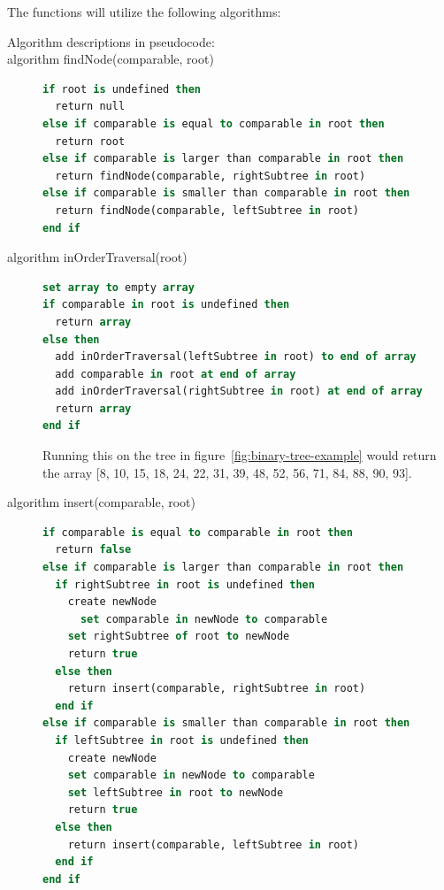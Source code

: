 \documentclass {article}
\begin{document}
The functions will utilize the following algorithms:
\begin{description}
\item[Algorithm descriptions in pseudocode:]
\item [algorithm findNode(comparable, root)]
\item[]
\begin{lstlisting}[language=Pascal]
if root is undefined then
  return null
else if comparable is equal to comparable in root then
  return root
else if comparable is larger than comparable in root then
  return findNode(comparable, rightSubtree in root)
else if comparable is smaller than comparable in root then
  return findNode(comparable, leftSubtree in root)
end if
\end{lstlisting}
 
\item [algorithm inOrderTraversal(root)]
\item []
\begin{lstlisting}[language=Pascal]
set array to empty array
if comparable in root is undefined then
  return array
else then
  add inOrderTraversal(leftSubtree in root) to end of array
  add comparable in root at end of array
  add inOrderTraversal(rightSubtree in root) at end of array
  return array
end if
\end{lstlisting}
 
\item[] Running this on the tree in figure~\ref{fig:binary-tree-example} would return the array [8, 10, 15, 18, 24, 22, 31, 39, 48, 52, 56, 71, 84, 88, 90, 93].
 
\item [algorithm insert(comparable, root)]
\item []
\begin{lstlisting}[language=Pascal]
if comparable is equal to comparable in root then
  return false
else if comparable is larger than comparable in root then
  if rightSubtree in root is undefined then
    create newNode
	  set comparable in newNode to comparable
    set rightSubtree of root to newNode
    return true
  else then
    return insert(comparable, rightSubtree in root)
  end if
else if comparable is smaller than comparable in root then
  if leftSubtree in root is undefined then 
    create newNode
    set comparable in newNode to comparable
    set leftSubtree in root to newNode
    return true
  else then
    return insert(comparable, leftSubtree in root)
  end if
end if
\end{lstlisting}
\end{description}
\end{document}

